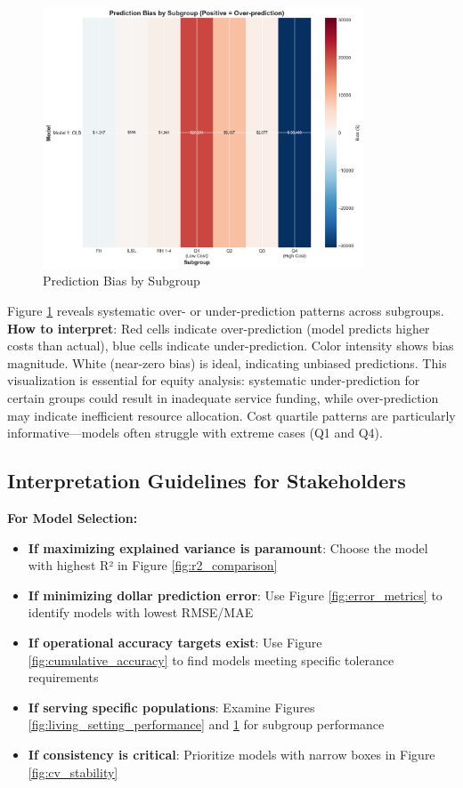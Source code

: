\begin{figure}[h!]
\centering
\includegraphics[width=0.85\textwidth]{figures/plot_i_bias_heatmap.png}
\caption{Prediction Bias by Subgroup}
\label{fig:bias_heatmap}
\end{figure}

Figure \ref{fig:bias_heatmap} reveals systematic over- or under-prediction patterns across subgroups. \textbf{How to interpret}: Red cells indicate over-prediction (model predicts higher costs than actual), blue cells indicate under-prediction. Color intensity shows bias magnitude. White (near-zero bias) is ideal, indicating unbiased predictions. This visualization is essential for equity analysis: systematic under-prediction for certain groups could result in inadequate service funding, while over-prediction may indicate inefficient resource allocation. Cost quartile patterns are particularly informative—models often struggle with extreme cases (Q1 and Q4).

\subsection{Interpretation Guidelines for Stakeholders}

\textbf{For Model Selection:}
\begin{itemize}
    \item \textbf{If maximizing explained variance is paramount}: Choose the model with highest R² in Figure \ref{fig:r2_comparison}
    \item \textbf{If minimizing dollar prediction error}: Use Figure \ref{fig:error_metrics} to identify models with lowest RMSE/MAE
    \item \textbf{If operational accuracy targets exist}: Use Figure \ref{fig:cumulative_accuracy} to find models meeting specific tolerance requirements
    \item \textbf{If serving specific populations}: Examine Figures \ref{fig:living_setting_performance} and \ref{fig:bias_heatmap} for subgroup performance
    \item \textbf{If consistency is critical}: Prioritize models with narrow boxes in Figure \ref{fig:cv_stability}
\end{itemize}

